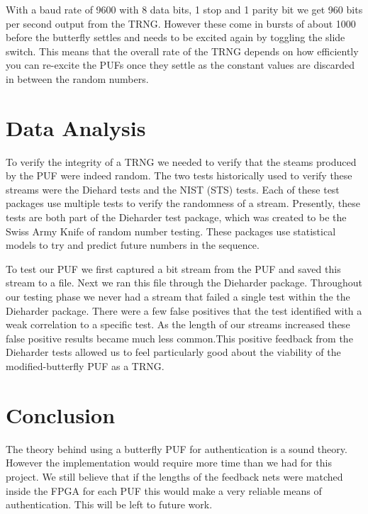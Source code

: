 		With a baud rate of 9600 with 8 data bits, 1 stop and 1 parity bit we get 960 bits per second output from the TRNG.  However these come in bursts of about 1000 before the butterfly settles and needs to be excited again by toggling the slide switch.  This means that the overall rate of the TRNG depends on how efficiently you can re-excite the PUFs once they settle as the constant values are discarded in between the random numbers.
		
	
	

\section{Data Analysis}\label{sec::analysis} 
	To verify the integrity of a TRNG we needed to verify that the steams produced by the PUF were indeed random. The two tests historically used to verify these streams were the Diehard tests and the NIST (STS) tests. Each of these test packages use multiple tests to verify the randomness of a stream. Presently, these tests are both part of the Dieharder test package, which was created to be the Swiss Army Knife of random number testing. These packages use statistical models to try and predict future numbers in the sequence.

	To test our PUF we first captured a bit stream from the PUF and saved this stream to a file. Next we ran this file through the Dieharder package. Throughout our testing phase we never had a stream that failed a single test within the the Dieharder package. There were a few false positives that the test identified with a weak correlation to a specific test. As the length of our streams increased these false positive results became much less common.This positive feedback from the Dieharder tests allowed us to feel particularly good about the viability of the modified-butterfly PUF as a TRNG.

\section{Conclusion}\label{sec::conclusion} 
		The theory behind using a butterfly PUF for authentication is a sound theory.  However the implementation would require more time than we had for this project.  We still believe that if the lengths of the feedback nets were matched inside the FPGA for each PUF this would make a very reliable means of authentication.  This will be left to future work.
		

